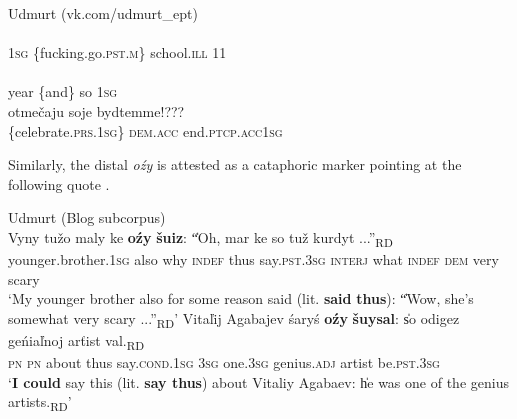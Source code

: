 \documentclass[output=paper,colorlinks,citecolor=brown]{langscibook}
\begin{document}
\ea\label{ex:teptiuk:14} {Udmurt (vk.com/udmurt\_ept)}\\
\\
 1\textsc{sg} \{fucking.go.\textsc{pst}.\textsc{m\}} school.\textsc{ill} 11\\
\\
 year \{and\} so 1\textsc{sg}\\
\gll otmečaju soje bydtemme!???\\
 \{celebrate.\textsc{prs}.1\textsc{sg\}} \textsc{dem}.\textsc{acc} end.\textsc{ptcp}.\textsc{acc}1\textsc{sg}\\
\z

Similarly, the distal \textit{oźy} is attested as a cataphoric marker pointing at the following quote .

\ea\label{ex:teptiuk:15} {Udmurt (Blog subcorpus)}\\
\ea\label{ex:teptiuk:15a}
\gll Vyny tužo maly ke \textbf{oźy} \textbf{šuiz}: \|“Oh, mar ke so  tuž kurdyt ...”\|\textsubscript{RD} \\
 younger.brother.1\textsc{sg} also why \textsc{indef} thus say.\textsc{pst.3sg} {\db}\textsc{interj} what \textsc{indef} \textsc{dem} very {\db}scary\\
\glt ‘My younger brother also for some reason said (lit. \textbf{said} \textbf{thus}): \|“Wow, she’s somewhat very scary ...”\|\textsubscript{RD}’
\ex\label{ex:teptiuk:15b}
\gll Vitaľij Agabajev śaryś \textbf{oźy} \textbf{šuysal}: \|so odigez geńiaľnoj arťist val.\|\textsubscript{RD} \\
\textsc{pn} \textsc{pn} about thus say.\textsc{cond.1sg} {\db}\textsc{3sg} one.3\textsc{sg} genius.\textsc{adj} artist be.\textsc{pst.3sg}\\
\glt ‘\textbf{I could} say this (lit. \textbf{say thus}) about Vitaliy Agabaev: \|he was one of the genius artists.\|\textsubscript{RD}’
\z
\z
\end{document}
